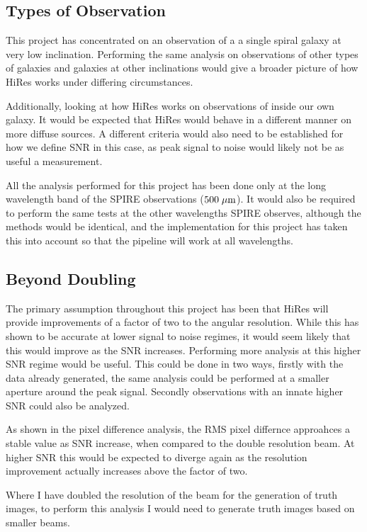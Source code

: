 \subsection{Types of Observation}

This project has concentrated on an observation of a a single spiral galaxy at very low inclination. Performing the same analysis on observations of other types of galaxies and galaxies at other inclinations would give a broader picture of how HiRes works under differing circumstances.

Additionally, looking at how HiRes works on observations of inside our own galaxy. It would be expected that HiRes would behave in a different manner on more diffuse sources. A different criteria would also need to be established for how we define SNR in this case, as peak signal to noise would likely not be as useful a measurement.

All the analysis performed for this project has been done only at the long wavelength band of the SPIRE observations ($500 \;\mathrm{\mu m}$). It would also be required to perform the same tests at the other wavelengths SPIRE observes, although the methods would be identical, and the implementation for this project has taken this into account so that the pipeline will work at all wavelengths.

\subsection{Beyond Doubling}

The primary assumption throughout this project has been that HiRes will provide improvements of a factor of two to the angular resolution. While this has shown to be accurate at lower signal to noise regimes, it would seem likely that this would improve as the SNR increases. Performing more analysis at this higher SNR regime would be useful. This could be done in two ways, firstly with the data already generated, the same analysis could be performed at a smaller aperture around the peak signal. Secondly observations with an innate higher SNR could also be analyzed.

As shown in the pixel difference analysis, the RMS pixel differnce approahces a stable value as SNR increase, when compared to the double resolution beam. At higher SNR this would be expected to diverge again as the resolution improvement actually increases above the factor of two.

Where I have doubled the resolution of the beam for the generation of truth images, to perform this analysis I would need to generate truth images based on smaller beams.

